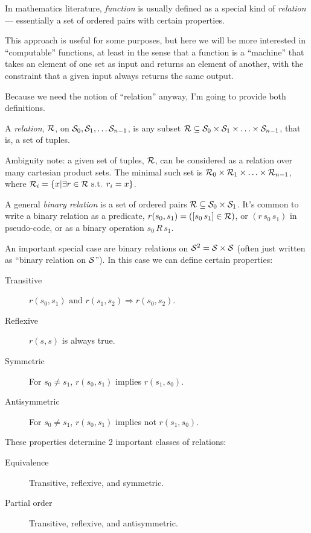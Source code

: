 \label{sec:Functions}

In mathematics literature, \textit{function} is usually defined as
a special kind of \textit{relation} --- essentially a set of
ordered pairs with certain properties.

This approach is useful for some purposes, but here we will be
more interested in ``computable'' functions, at least in the sense
that a function is a ``machine'' that takes an element of one set
as input and returns an element of another, with the constraint
that a given input always returns the same output.

Because we need the notion of ``relation'' anyway, I'm going to
provide both definitions.

\label{sec:Relations}

A \textit{relation}, 
$\mathcal{R}$, on $\mathcal{S}_0, \mathcal{S}_1, \ldots \mathcal{S}_{n-1}$,  
is any subset 
$\mathcal{R} \subseteq \mathcal{S}_0 \times \mathcal{S}_1 \times \ldots 
\times \mathcal{S}_{n-1}$,
that is, a set of tuples.

Ambiguity note: a given set of tuples, $\mathcal{R}$, can be
considered as a relation over many cartesian product sets.
The minimal such set is 
$\mathcal{R}_0 \times \mathcal{R}_1 \times \ldots \times
\mathcal{R}_{n-1}$, 
where 
$\mathcal{R}_i = \{ x | \exists r 
\in \mathcal{R} \text{ s.t. } r_i = x\}$.

A general \textit{binary relation} is a set of ordered
pairs $\mathcal{R} \subseteq \mathcal{S}_0 \times \mathcal{S}_1$.
It's common to write a binary relation as a predicate, 
$r(s_0,s_1) = ([s_0 \, s_1] \in \mathcal{R})$,
or $(r \, s_0 \, s_1)$ in pseudo-code,
or as a binary operation $s_0 \, R \, s_1$.

An important special case
are binary relations on $\mathcal{S}^2 = \mathcal{S} \times \mathcal{S}$
(often just written as ``binary relation on $\mathcal{S}$''). 
In this case we can define certain properties:

\begin{description}
\item[Transitive]
$r(s_0,s_1) \text{ and } r(s_1,s_2) \Rightarrow r(s_0,s_2)$.
\item[Reflexive] $r(s,s)$ is always true.
\item[Symmetric] For $s_0 \neq s_1$, $r(s_0,s_1)$ implies
$r(s_1,s_0)$.
\item[Antisymmetric] For $s_0 \neq s_1$, $r(s_0,s_1)$ implies not
$r(s_1,s_0)$.
\end{description}
These properties determine 2 important classes of relations:
\begin{description}
\item[Equivalence] Transitive, reflexive, and symmetric.
\item[Partial order] \label{def:partial-order}
Transitive, reflexive, and antisymmetric.
\end{description}


